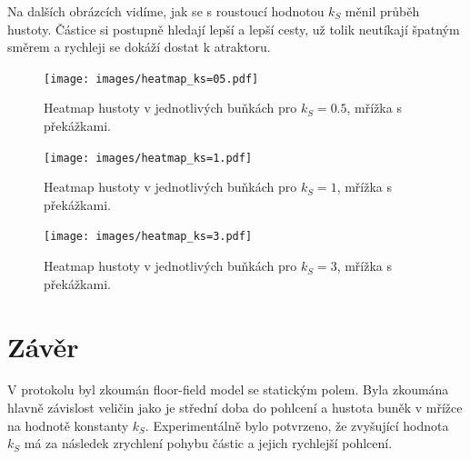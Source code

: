 \documentclass[a4paper, 12pt, fleqn]{article}
\begin{document}
	Na dalších obrázcích vidíme, jak se s roustoucí hodnotou $k_S$ měnil průběh hustoty. Částice si postupně hledají lepší a lepší cesty, už tolik neutíkají špatným směrem a rychleji se dokáží dostat k atraktoru.
	
	\begin{figure}
		\centering
		\texttt{[image: images/heatmap\_ks=05.pdf]}
		\caption{Heatmap hustoty v jednotlivých buňkách pro $k_S = 0.5$, mřížka s překážkami.}
		\label{Obr: Heatmap ks=0.5}
	\end{figure}
	
	\begin{figure}
		\centering
		\texttt{[image: images/heatmap\_ks=1.pdf]}
		\caption{Heatmap hustoty v jednotlivých buňkách pro $k_S = 1$, mřížka s překážkami.}
		\label{Obr: Heatmap ks=1}
	\end{figure}
	
	\begin{figure}
		\centering
		\texttt{[image: images/heatmap\_ks=3.pdf]}
		\caption{Heatmap hustoty v jednotlivých buňkách pro $k_S = 3$, mřížka s překážkami.}
		\label{Obr: Heatmap ks=3}
	\end{figure}
	
	\section{Závěr}
	
	V protokolu byl zkoumán floor-field model se statickým polem. Byla zkoumána hlavně závislost veličin jako je střední doba do pohlcení a hustota buněk v mřížce na hodnotě konstanty $k_S$. Experimentálně bylo potvrzeno, že zvyšující hodnota $k_S$ má za následek zrychlení pohybu částic a jejich rychlejší pohlcení.
	
\end{document}
